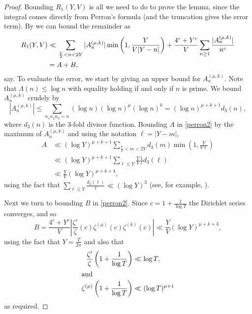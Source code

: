 \documentclass[12pt, a4paper,reqno]{amsart}
\theoremstyle{definition}
\numberwithin{equation}{section}
\begin{document}
\begin{proof}
Bounding $R_1(Y,V)$ is all we need to do to prove the lemma, since the integral comes directly from Perron's formula (and the truncation gives the error term). By \cite[Cor 5.3]{Montgomery_Vaughan_2006} we can bound the remainder as 
\begin{align}
    R_1(Y,V)&\ll\sum_{\frac{Y}{2}<n<2Y}|A_n^{(\mu,k)}|\min\left(1,\frac{Y}{V|Y-n|}\right)+\frac{4^c+Y^c}{V}\sum_{n\ge 1}\frac{|A_n^{(\mu,k)}|}{ n^c}\notag\\
    &=A+B\label{perron2},
\end{align}
say. To evaluate the error, we start by giving an upper bound for $A_n^{(\mu,k)}$. Note that $\Lambda(n)\leq \log n$  with equality holding if and only if $n$ is prime. We bound $A_n^{(\mu,k)}$ crudely by
\begin{equation*}
    \left|A_n^{(\mu,k)}\right| \leq \sum_{n_1n_2n_3=n}(\log n)(\log n)^{\mu}(\log n)^{k}= (\log n)^{\mu+k+1}d_3(n),
\end{equation*}
where $d_3(n)$ is the $3$-fold divisor function. Bounding $A$ in \eqref{perron2} by the maximum of $A_n^{(\mu,k)}$ and using the notation $\ell=|Y-m|$, 
\begin{align*}
    A&\ll (\log Y)^{\mu+k+1}\sum_{\frac{Y}{2}<m<2Y}d_3(m)\min\left(1,\frac{Y}{V\ell}\right)\\&\ll(\log Y)^{\mu+k+1}\sum_{\ell\le Y}\frac{Y}{V}\frac{1}{\ell}d_3(\ell)\\&\ll\frac{Y}{V}(\log Y)^{\mu+k+4},
\end{align*}
using the fact that $\sum_{\ell\le Y}\frac{d_3(\ell)}{\ell}\ll (\log Y)^3$ (see, for example, \cite[p.43]{Montgomery_Vaughan_2006}). 

Next we turn to bounding $B$ in \eqref{perron2}. Since $c=1+\frac{1}{\log T}$ the Dirichlet series converges, and so \begin{equation*}
    B=\frac{4^c+Y^c}{V}\left|\frac{\zeta'}{\zeta}(c)\zeta^{(\mu)}(c)\zeta^{(k)}(c)\right|\ll\frac{Y}{V}(\log Y)^{\mu+k+3},
\end{equation*}
using the fact that $Y = \frac{T}{2\pi}$ and also that 
\begin{align}
    \frac{\zeta'}{\zeta}\left(1+\frac{1}{\log T}\right) &\ll \log T, \label{eq:LogDerivZetaNearPole}\\
\intertext{and}
    \zeta^{(\mu)}\left(1+\frac{1}{\log T}\right) &\ll (\log T)^{\mu+1}\label{eq:DerivZetaNearPole}
\end{align}
as required.
\end{proof}
\end{document}
